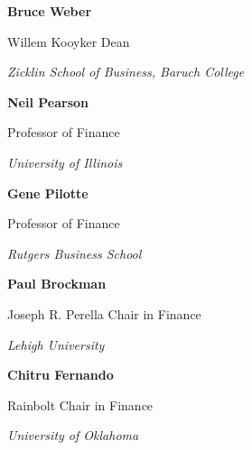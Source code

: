 \documentclass[11pt,a4paper,]{awesome-cv}
\begin{document}
\textbf{Bruce Weber}

Willem Kooyker Dean

\textit{Zicklin School of Business, Baruch College}

\textbf{Neil Pearson}

Professor of Finance

\textit{University of Illinois}

\textbf{Gene Pilotte}

Professor of Finance

\textit{Rutgers Business School}

\textbf{Paul Brockman}

Joseph R. Perella Chair in Finance

\textit{Lehigh University}

\textbf{Chitru Fernando}

Rainbolt Chair in Finance

\textit{University of Oklahoma}
\end{document}
